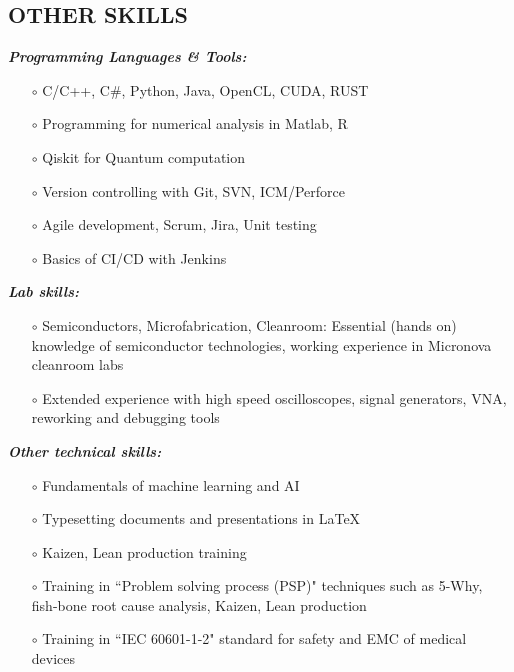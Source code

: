 \documentclass[margin , 10pt]{res} %
\renewcommand{\headrulewidth}{0.3pt}
\begin{document}
\begin{resume}
		\section{OTHER SKILLS}
		{\sl \textbf{Programming Languages \& Tools:}} \dotfill
		\begin{itemize}
			\item[$\circ$] C/C++, 
			C\#, Python, Java,  OpenCL, CUDA, RUST
			\item[$\circ$] Programming for numerical analysis in Matlab, R
			\item[$\circ$] Qiskit for Quantum computation
			\item[$\circ$] Version controlling with Git, SVN, ICM/Perforce 
			\item[$\circ$] Agile development, Scrum, Jira, Unit testing
			\item[$\circ$] Basics of CI/CD with Jenkins
		\end{itemize}
		
		
		
		{\sl \textbf{Lab skills:}}
		\begin{itemize}
			\item[$\circ$] Semiconductors, Microfabrication, Cleanroom: Essential (hands on) knowledge of semiconductor technologies, working experience in Micronova cleanroom labs
			\item[$\circ$] Extended experience with high speed oscilloscopes, signal generators, VNA, reworking and debugging tools
		\end{itemize}
		
		
		{\sl \textbf{Other technical skills:}}
		\begin{itemize}
			\item[$\circ$] Fundamentals of machine learning and AI
			\item[$\circ$] Typesetting documents and presentations in {\LaTeX}
			\item[$\circ$] Kaizen, Lean production training
			\item[$\circ$] Training in ``Problem solving process (PSP)" techniques such as 5-Why, fish-bone root cause analysis, Kaizen, Lean production 
			\item[$\circ$] Training in ``IEC 60601-1-2" standard for safety and EMC of medical devices
		\end{itemize}
		

\end{resume}
\end{document}
